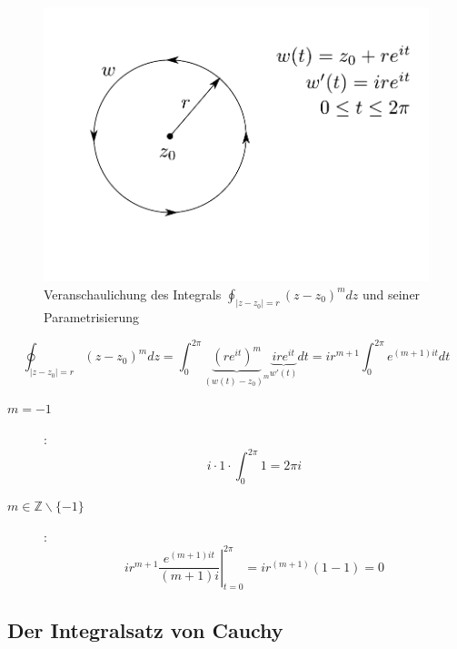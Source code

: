 \documentclass[10pt,a4paper]{article}
\begin{document}
\begin{figure}[H]
\includegraphics[width=\textwidth]{images/umlauf01}
\caption{Veranschaulichung des Integrals $\oint_{|z-z_0|=r} (z-z_0)^{m} dz$ und seiner Parametrisierung}
\end{figure}

$$\oint_{|z-z_0|=r} (z-z_0)^{m} dz = \int_{0}^{2\pi} \underbrace{(re^{it})^{m}}_{(w(t)-z_0)^{m}} \underbrace{ire^{it}}_{w'(t)} dt
= ir^{m+1} \int_{0}^{2\pi} e^{(m+1)it} dt$$

\begin{description}
\item[$m=-1$]: $$i \cdot 1 \cdot \int_{0}^{2\pi} 1 = 2\pi i $$
\item[$m \in \mathbb{Z}\backslash\{-1\}$]: $$ir^{m+1}  \left. \frac{e^{(m+1)it}}{(m+1)i}  \right|_{t=0}^{2 \pi} = ir^{(m+1)}(1-1)=0$$
\end{description}


\subsection{Der Integralsatz von Cauchy}
\end{document}
